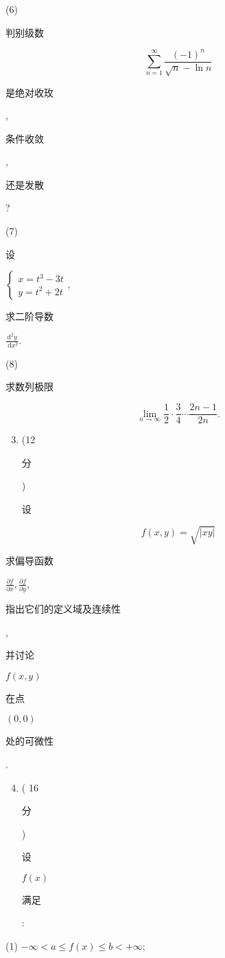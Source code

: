 \documentclass[10pt]{article}
\begin{document}
(6) \begin{CJK}{UTF8}{mj}判别级数\end{CJK}
$$
\sum_{n=1}^{\infty} \frac{(-1)^{n}}{\sqrt{n}-\ln n}
$$
\begin{CJK}{UTF8}{mj}是绝对收玫\end{CJK}, \begin{CJK}{UTF8}{mj}条件收敛\end{CJK}, \begin{CJK}{UTF8}{mj}还是发散\end{CJK}?

(7) \begin{CJK}{UTF8}{mj}设\end{CJK} $\left\{\begin{array}{l}x=t^{3}-3 t \\ y=t^{2}+2 t\end{array}\right.$, \begin{CJK}{UTF8}{mj}求二阶导数\end{CJK} $\frac{\mathrm{d}^{2} y}{\mathrm{~d} x^{2}}$.

(8) \begin{CJK}{UTF8}{mj}求数列极限\end{CJK}
$$
\lim _{n \rightarrow \infty} \frac{1}{2} \cdot \frac{3}{4} \cdots \frac{2 n-1}{2 n} .
$$

\begin{enumerate}
  \setcounter{enumi}{2}
  \item (12 \begin{CJK}{UTF8}{mj}分\end{CJK}) \begin{CJK}{UTF8}{mj}设\end{CJK}
\end{enumerate}
$$
f(x, y)=\sqrt{|x y|}
$$
\begin{CJK}{UTF8}{mj}求偏导函数\end{CJK} $\frac{\partial f}{\partial x}, \frac{\partial f}{\partial y}$, \begin{CJK}{UTF8}{mj}指出它们的定义域及连续性\end{CJK}, \begin{CJK}{UTF8}{mj}并讨论\end{CJK} $f(x, y)$ \begin{CJK}{UTF8}{mj}在点\end{CJK} $(0,0)$ \begin{CJK}{UTF8}{mj}处的可微性\end{CJK}.

\begin{enumerate}
  \setcounter{enumi}{3}
  \item ( 16 \begin{CJK}{UTF8}{mj}分\end{CJK}) \begin{CJK}{UTF8}{mj}设\end{CJK} $f(x)$ \begin{CJK}{UTF8}{mj}满足\end{CJK}:
\end{enumerate}
(1) $-\infty<a \leq f(x) \leq b<+\infty$;
\end{document}

